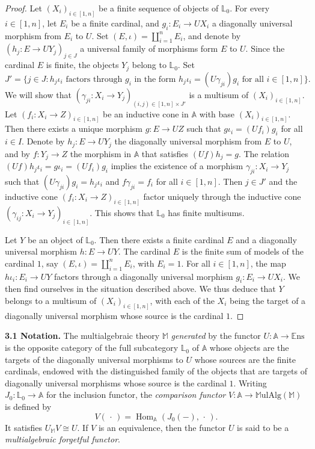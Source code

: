 \documentclass{article}
\newenvironment{rmenv}[1]
  {\phantomsection\par\medskip\noindent\textbf{#1.}\rmfamily}
  {\par\medskip}
\newcommand{\bb}[1]{{\mathbb{#1}}}
\newcommand{\Set}{\mathbb{E}\mathrm{ns}}
\newcommand{\MulAlg}{\mathbb{M}\mathrm{ulAlg}}
\DeclareMathOperator{\Hom}{Hom}
\newcommand{\oldpage}[1]{\marginpar{\footnotesize$\Big\vert$ \textit{p.~#1}}}
\begin{document}
\begin{proof}
  Let $(X_i)_{i\in[1,n]}$ be a finite sequence of objects of $\bb{L}_0$.
  For every $i\in[1,n]$, let $E_i$ be a finite cardinal, and $g_i\colon E_i\to UX_i$ a diagonally universal morphism from $E_i$ to $U$.
  Set $(E,\iota)=\coprod_{i=1}^nE_i$, and denote by $(h_j\colon E\to UY_j)_{j\in J}$ a universal family of morphisms form $E$ to $U$.
  Since the cardinal $E$ is finite, the objects $Y_j$ belong to $\bb{L}_0$.
  Set
  \[
    J' =
    \big\{
      j\in J
      :
      \mbox{$h_j\iota_i$ factors through $g_i$ in the form $h_j\iota_i=(U\gamma_{ji})g_i$ for all $i\in[1,n]$}
    \big\}.
  \]
  We will show that $(\gamma_{ji}\colon X_i\to Y_j)_{(i,j)\in[1,n]\times J'}$ is a multisum of $(X_i)_{i\in[1,n]}$.
  Let $(f_i\colon X_i\to Z)_{i\in[1,n]}$ be an inductive cone in $\bb{A}$ with base $(X_i)_{i\in[1,n]}$.
  Then there exists a unique morphism $g\colon E\to UZ$ such that $g\iota_i=(Uf_i)g_i$ for all $i\in I$.
  Denote by $h_j\colon E\to UY_j$ the diagonally universal morphism from $E$ to $U$, and by $f\colon Y_j\to Z$ the morphism in $\bb{A}$ that satisfies $(Uf)h_j=g$.
  The relation $(Uf)h_j\iota_i=g\iota_i=(Uf_i)g_i$ implies the existence of a morphism $\gamma_{ji}\colon X_i\to Y_j$ such that $(U\gamma_{ji})g_i=h_j\iota_i$ and $f\gamma_{ji}=f_i$ for all $i\in[1,n]$.
  Then $j\in J'$ and the inductive cone $(f_i\colon X_i\to Z)_{i\in[1,n]}$ factor uniquely through the inductive cone $(\gamma_{ij}\colon X_i\to Y_j)_{i\in[1,n]}$.
  This shows that $\bb{L}_0$ has finite multisums.

  Let $Y$ be an object of $\bb{L}_0$.
  Then there exists a finite cardinal $E$ and a diagonally universal morphism $h\colon E\to UY$.
  The cardinal $E$ is the finite sum of models of the cardinal $1$,
\oldpage{201}
  say $(E,\iota)=\coprod_{i=1}^nE_i$, with $E_i=1$.
  For all $i\in[1,n]$, the map $h\iota_i\colon E_i\to UY$ factors through a diagonally universal morphism $g_i\colon E_i\to UX_i$.
  We then find ourselves in the situation described above.
  We thus deduce that $Y$ belongs to a multisum of $(X_i)_{i\in[1,n]}$, with each of the $X_i$ being the target of a diagonally universal morphism whose source is the cardinal $1$.
\end{proof}

\begin{rmenv}{3.1 Notation}
\label{3.1}
  The multialgebraic theory $\bb{M}$ \emph{generated} by the functor $U\colon\bb{A}\to\Set$ is the opposite category of the full subcategory $\bb{L}_0$ of $\bb{A}$ whose objects are the targets of the diagonally universal morphisms to $U$ whose sources are the finite cardinals, endowed with the distinguished family of the objects that are targets of diagonally universal morphisms whose source is the cardinal $1$.
  Writing $J_0\colon\bb{L}_0\to\bb{A}$ for the inclusion functor, the \emph{comparison functor} $V\colon\bb{A}\to\MulAlg(\bb{M})$ is defined by
  \[
    V(\,\cdot\,) = \Hom_\bb{A}(J_0(-),\,\cdot\,).
  \]
  It satisfies $U_\bb{M}V\cong U$.
  If $V$ is an equivalence, then the functor $U$ is said to be a \emph{multialgebraic forgetful functor}.
\end{rmenv}
\end{document}
